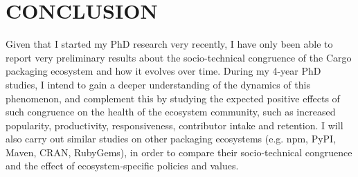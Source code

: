 \section{CONCLUSION}

Given that I started my PhD research very recently, I have only been able to report very preliminary results about the socio-technical congruence of the Cargo packaging ecosystem and how it evolves over time.
During my 4-year PhD studies, I intend to gain a deeper understanding of the dynamics of this phenomenon, and complement this by studying the expected positive effects of such congruence on the health of the ecosystem community, such as increased popularity, productivity, responsiveness, contributor intake and retention.
I will also carry out similar studies on other packaging ecosystems  (e.g. npm, PyPI, Maven, CRAN, RubyGems), in order to compare their socio-technical congruence and the effect of ecosystem-specific policies and values.
